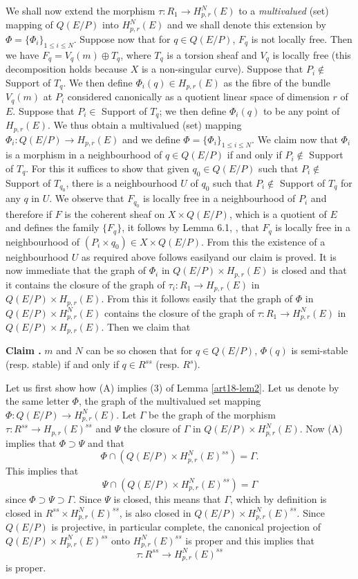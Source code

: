 We shall now extend the morphism $\tau:R_{1}\to H^{N}_{p,r}(E)$ to a {\em multivalued} (set) mapping of $Q(E/P)$ into $H^{N}_{p,r}(E)$ and we shall denote this extension by $\Phi=\{\Phi_{i}\}_{1\leq i\leq N}$. Suppose now that for $q\in Q(E/P)$, $F_{q}$ is not locally free. Then we have $F_{q}=V_{q}(m)\oplus T_{q}$, where $T_{q}$ is a torsion sheaf and $V_{q}$ is locally free (this decomposition holds because $X$ is a non-singular curve). Suppose that $P_{i}\not\in$ Support of $T_{q}$. We then define $\Phi_{i}(q)\in H_{p,r}(E)$ as the fibre of the bundle $V_{q}(m)$ at $P_{i}$ considered canonically as a quotient linear space of dimension $r$ of $E$. Suppose that $P_{i}\in$ Support of $T_{q}$; we then define $\Phi_{i}(q)$ to be any point of $H_{p,r}(E)$. We thus obtain a multivalued (set) mapping $\Phi_{i}:Q(E/P)\to H_{p,r}(E)$ and we define $\Phi=\{\Phi_{i}\}_{1\leq i\leq N}$. We claim now that $\Phi_{i}$ is a morphism in a neighbourhood of $q\in Q(E/P)$ if and only if $P_{i}\not\in$ Support of $T_{q}$. For this it suffices to show that given $q_{0}\in Q(E/P)$ such that $P_{i}\not\in$ Support of $T_{q_{0}}$, there is a neighbourhood $U$ of $q_{0}$ such that $P_{i}\not\in$ Support of $T_{q}$ for any $q$ in $U$. We observe that $F_{q_{0}}$ is locally free in a neighbourhood of $P_{i}$ and therefore if $F$ is the coherent sheaf on $X\times Q(E/P)$, which is a quotient of $E$ and defines the family $\{F_{q}\}$, it follows by Lemma 6.1, \cite{art18-key12}, that $F_{q}$ is locally free in a neighbourhood of $(P_{i}\times q_{0})\in X\times Q(E/P)$. From this the existence of a neighbourhood $U$ as required above follows easily\pageoriginale and our claim is proved. It is now immediate that the graph of $\Phi_{i}$ in $Q(E/P)\times H_{p,r}(E)$ is closed and that it contains the closure of the graph of $\tau_{i}:R_{1}\to H_{p,r}(E)$ in $Q(E/P)\times H_{p,r}(E)$. From this it follows easily that the graph of $\Phi$ in $Q(E/P)\times H^{N}_{p,r}(E)$ contains the closure of the graph of $\tau:R_{1}\to H^{N}_{p,r}(E)$ in $Q(E/P)\times H_{p,r}(E)$. Then we claim that

\medskip
\noindent
{\bf Claim .\label{art18-claim-A}}
$m$ and $N$ can be so chosen that for $q\in Q(E/P)$, $\Phi(q)$ is semi-stable (resp. stable) if and only if $q\in R^{ss}$ (resp. $R^{s}$).
\smallskip

Let us first show how (A) implies (3) of Lemma \ref{art18-lem2}. Let us denote by the same letter $\Phi$, the graph of the multivalued set mapping $\Phi:Q(E/P)\to H^{N}_{p,r}(E)$. Let $\Gamma$ be the graph of the morphism $\tau :R^{ss}\to H_{p,r}(E)^{ss}$ and $\Psi$ the closure of $\Gamma$ in $Q(E/P)\times H^{N}_{p,r}(E)$. Now (A) implies that $\Phi\supset \Psi$ and that
$$
\Phi\cap (Q(E/P)\times H^{N}_{p,r}(E)^{ss})=\Gamma.
$$
This implies that
$$
\Psi \cap (Q(E/P)\times H^{N}_{p,r}(E)^{ss})=\Gamma
$$
since $\Phi\supset \Psi\supset \Gamma$. Since $\Psi$ is closed, this means that $\Gamma$, which by definition is closed in $R^{ss}\times H^{N}_{p,r}(E)^{ss}$, is also closed in $Q(E/P)\times H^{N}_{p,r}(E)^{ss}$. Since $Q(E/P)$ is projective, in particular complete, the canonical projection of $Q(E/P)\times H^{N}_{p,r}(E)^{ss}$ onto $H^{N}_{p,r}(E)^{ss}$ is proper and this implies that
$$
\tau :R^{ss}\to H^{N}_{p,r}(E)^{ss}
$$
is proper.


